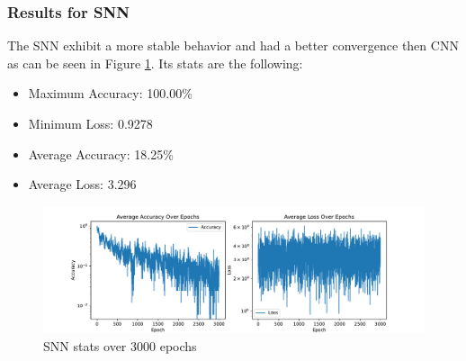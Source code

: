 			\subsubsection{Results for SNN}
				\par The SNN exhibit a more stable behavior and had a better convergence then CNN as can be seen in Figure \ref{fig:snnacculoss}. Its stats are the following:
				\begin{itemize}
					\item Maximum Accuracy: 100.00\%
					\item Minimum Loss: 0.9278
					\item Average Accuracy: 18.25\%
					\item Average Loss: 3.296
				\end{itemize}
				\begin{figure}[H]
					\centering
					\includegraphics[width=\linewidth]{images/snnAccuLoss}
					\caption{SNN stats over 3000 epochs}
					\label{fig:snnacculoss}
				\end{figure}
			

		
			\twocolumn
	
	
	
